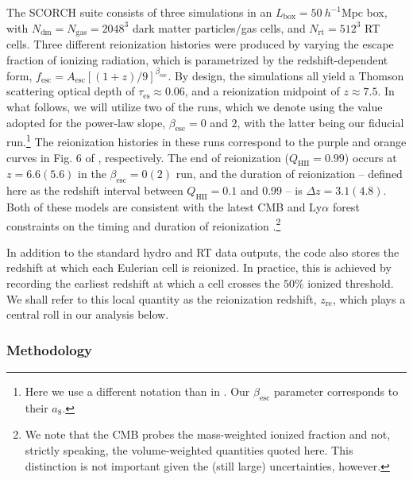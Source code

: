 \documentclass[twocolumn]{aastex62}
\newcommand{\zreion}{z_{\mathrm{re}}}
\newcommand{\Mpc}{\mathrm{Mpc}}
\begin{document}
The SCORCH suite consists of three simulations in an $L_{\mathrm{box}} = 50~h^{-1}\Mpc$ box, with $N_{\mathrm{dm}} = N_{\mathrm{gas}}=2048^3$ dark matter particles/gas cells, and $N_{\mathrm{rt}}=512^3$ RT cells.  Three different reionization histories were produced by varying the escape fraction of ionizing radiation, which is parametrized by the redshift-dependent form, $f_{\mathrm{esc}} = A_{\mathrm{esc}}[(1+z)/9]^{\beta_{\mathrm{esc}}}$.  By design, the simulations all yield a Thomson scattering optical depth of $\tau_{\mathrm{es}} \approx 0.06$, and a reionization midpoint of $z\approx 7.5$.  In what follows, we will utilize two of the runs, which we denote using the value adopted for the power-law slope, $\beta_{\mathrm{esc}} = 0$ and $2$, with the latter being our fiducial run.\footnote{Here we use a different notation than in \citet{2017arXiv171204464D}.  Our $\beta_{\mathrm{esc}}$ parameter corresponds to their $a_8$. }  The reionization histories in these runs correspond to the purple and orange curves in Fig. 6 of \citet{2017arXiv171204464D}, respectively.  The end of reionization ($Q_{\mathrm{HII}} = 0.99$) occurs at $z=6.6(5.6)$ in the $\beta_{\mathrm{esc}} = 0(2)$ run, and the duration of reionization -- defined here as the redshift interval between $Q_{\mathrm{HII}}=0.1$ and 0.99 -- is $\Delta z = 3.1(4.8)$.  Both of these models are consistent with the latest CMB and Ly$\alpha$ forest constraints on the timing and duration of reionization \citep{mcgreer15, 2015ApJ...799..177G, 2016A&amp;A...596A.108P}.\footnote{We note that the CMB probes the mass-weighted ionized fraction and not, strictly speaking, the volume-weighted quantities quoted here.  This distinction is not important given the (still large) uncertainties, however.}  

In addition to the standard hydro and RT data outputs, the code also stores the redshift at which each Eulerian cell is reionized. In practice, this is achieved by recording the earliest redshift at which a cell crosses the $50\%$ ionized threshold.  We shall refer to this local quantity as the reionization redshift, $\zreion$, which plays a central roll in our analysis below.    

\subsubsection{Methodology}
\label{sec:vIFmethods}
\end{document}
